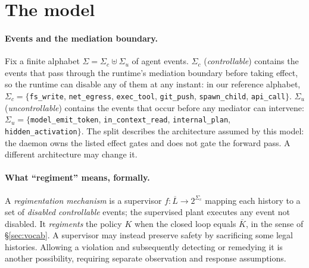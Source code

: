 \documentclass[11pt,a4paper]{article}  \usepackage{mdframed} \usepackage{graphicx} \usepackage{tabularx}
\begin{document}
\section{The model}\label{sec:model} \paragraph{Events and the mediation boundary.} Fix a finite alphabet
$\Sigma=\Sigma_c\uplus\Sigma_u$ of agent events. $\Sigma_c$ (\emph{controllable}) contains the events that pass through the
runtime's mediation boundary before taking effect, so the runtime can disable any of them at any instant: in our reference
alphabet, $\Sigma_c=\{$\texttt{fs\_\allowbreak write}, \texttt{net\_\allowbreak egress}, \texttt{exec\_\allowbreak tool}, \texttt{git\_\allowbreak push},
\texttt{spawn\_\allowbreak child}, \texttt{api\_\allowbreak call}$\}$. $\Sigma_u$ (\emph{uncontrollable}) contains the events that occur before any
mediator can intervene: $\Sigma_u=\{$\texttt{model\_\allowbreak emit\_\allowbreak token}, \texttt{in\_\allowbreak context\_\allowbreak read}, \texttt{internal\_\allowbreak plan},
\texttt{hidden\_\allowbreak activation}$\}$. The split describes the architecture assumed by this model: the daemon owns
the listed effect gates and does not gate the forward pass. A different
architecture may change it.

\paragraph{What ``regiment'' means, formally.} A \emph{regimentation mechanism} is a supervisor $f:\overline{L}\to
2^{\Sigma_c}$ mapping each history to a set of \emph{disabled controllable} events; the supervised plant executes any event
not disabled. It \emph{regiments} the policy $K$ when the closed loop equals $\overline{K}$, in the sense of
\S\ref{sec:vocab}. A supervisor may instead preserve safety by sacrificing some legal histories.
Allowing a violation and subsequently detecting or remedying it is another
possibility, requiring separate observation and response assumptions.
\end{document}
